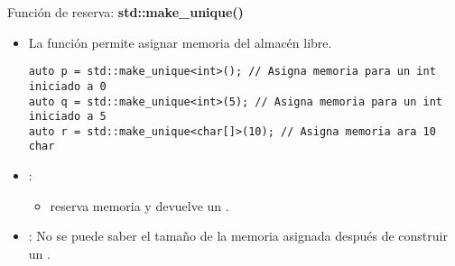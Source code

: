 \begin{frame}[t,fragile]{Función de reserva: \textbf{std::make\_unique()}}
\begin{itemize}
  \item La función  permite asignar memoria del 
        almacén libre.
\begin{lstlisting}
auto p = std::make_unique<int>(); // Asigna memoria para un int iniciado a 0
auto q = std::make_unique<int>(5); // Asigna memoria para un int iniciado a 5
auto r = std::make_unique<char[]>(10); // Asigna memoria ara 10 char
\end{lstlisting}

  \item {}:
    \begin{itemize}
      \item {} reserva memoria y devuelve 
            un .
    \end{itemize}

  \item {}: No se puede saber el tamaño de la memoria asignada 
        después de construir un .
\end{itemize}
\end{frame}
